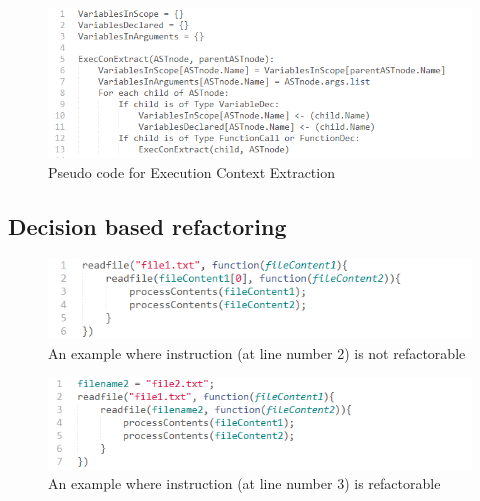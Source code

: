 \documentclass[10pt,conference]{IEEEtran}
\begin{document}
\begin{figure}[htbp]
	\includegraphics[scale=0.5]{code-execcon-extract.png}
	\caption{Pseudo code for Execution Context Extraction}
	\label{fig}
\end{figure}

\subsection{Decision based refactoring}

\begin{figure}[htbp]
	\includegraphics[scale=0.5]{not-refactorable-example.png}
	\caption{An example where instruction (at line number 2) is not refactorable}
	\label{fig}
\end{figure}

\begin{figure}[htbp]
	\includegraphics[scale=0.5]{refactorable-example.png}
	\caption{An example where instruction (at line number 3) is refactorable}
	\label{fig}
\end{figure}
\end{document}
